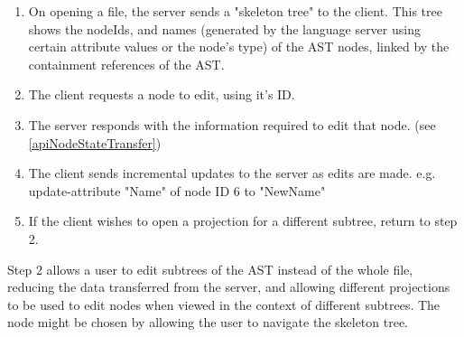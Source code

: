\documentclass{article}
\begin{document}
\begin{enumerate}
\item On opening a file, the server sends a "skeleton tree" to the client. This tree shows the nodeIds, and names (generated by the language server using certain attribute values or the node's type) of the AST nodes, linked by the containment references of the AST.
\item The client requests a node to edit, using it’s ID. 
\item The server responds with the information required to edit that node. (see \ref{apiNodeStateTransfer})
\item The client sends incremental updates to the server as edits are made. e.g. update-attribute "Name" of node ID 6 to "NewName"
\item If the client wishes to open a projection for a different subtree, return to step 2.
\end{enumerate}{
Step 2 allows a user to edit subtrees of the AST instead of the whole file, reducing the data transferred from the server, and allowing different projections to be used to edit nodes when viewed in the context of different subtrees. The node might be chosen by allowing the user to navigate the skeleton tree.

}
\end{document}
